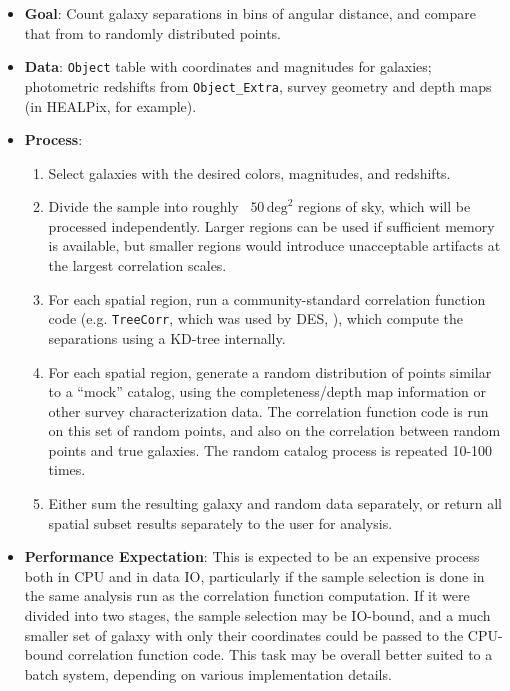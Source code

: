 \documentclass[DM,authoryear,toc]{lsstdoc}
\begin{document}
\begin{itemize}
  \item \textbf{Goal}: Count galaxy separations in bins of angular distance,
  and compare that from to randomly distributed points.
  \item \textbf{Data}: \texttt{Object} table with coordinates and magnitudes
  for galaxies; photometric redshifts from \texttt{Object\_Extra}, survey
  geometry and depth maps (in HEALPix, for example).
  \item \textbf{Process}: 
    \begin{enumerate}
      \item Select galaxies with the desired colors, magnitudes, and redshifts.
      \item Divide the sample into roughly ~$50 \, \textrm{deg}^2$ regions of
      sky, which will be processed independently. Larger regions can be used
      if sufficient memory is available, but smaller regions would introduce
      unacceptable artifacts at the largest correlation scales.
      \item For each spatial region, run a community-standard correlation
      function code (e.g. \texttt{TreeCorr}, which was used by DES,
      \citealt{2017arXiv170801536E}), which
      compute the separations using a KD-tree internally.
      \item For each spatial region, generate a random distribution of points
      similar to a ``mock'' catalog, using the completeness/depth map
      information or other survey characterization data. The correlation
      function code is run on this set of random points, and also on the
      correlation between random points and true galaxies. The random catalog process is repeated 10-100 times.
      \item Either sum the resulting galaxy and random data separately, or
      return all spatial subset results separately to the user for analysis.
    \end{enumerate}
  \item \textbf{Performance Expectation}: This is expected to be an expensive
  process both in CPU and in data IO, particularly if the sample selection is
  done in the same analysis run as the correlation function computation. If
  it were divided into two stages, the sample selection may be IO-bound, and a
  much smaller set of galaxy with only their coordinates could be passed to
  the CPU-bound correlation function code. This task may be overall better
  suited to a batch system, depending on various implementation details.
\end{itemize}
\end{document}
